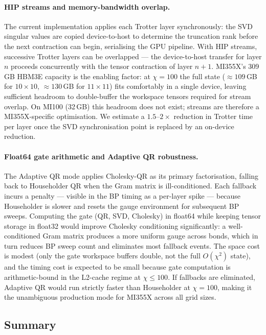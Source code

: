 \paragraph{HIP streams and memory-bandwidth overlap.}
The current implementation applies each Trotter layer synchronously:
the SVD singular values are copied device-to-host to determine the
truncation rank before the next contraction can begin, serialising the
GPU pipeline.
With HIP streams, successive Trotter layers can be overlapped ---
the device-to-host transfer for layer $n$ proceeds concurrently with
the tensor contraction of layer $n+1$.
MI355X's 309\,GB HBM3E capacity is the enabling factor: at $\chi=100$
the full state (${\approx}109$\,GB for $10\times10$, ${\approx}130$\,GB
for $11\times11$) fits comfortably in a single device, leaving sufficient
headroom to double-buffer the workspace tensors required for stream overlap.
On MI100 (32\,GB) this headroom does not exist; streams are therefore
a MI355X-specific optimisation.
We estimate a $1.5$--$2\times$ reduction in Trotter time per layer once
the SVD synchronisation point is replaced by an on-device reduction.

\paragraph{Float64 gate arithmetic and Adaptive QR robustness.}
The Adaptive QR mode applies Cholesky-QR as its primary factorisation,
falling back to Householder QR when the Gram matrix is ill-conditioned.
Each fallback incurs a penalty --- visible in the BP timing as a
per-layer spike --- because Householder is slower and resets the gauge
environment for subsequent BP sweeps.
Computing the gate (QR, SVD, Cholesky) in float64 while keeping tensor
storage in float32 would improve Cholesky conditioning significantly:
a well-conditioned Gram matrix produces a more uniform gauge across bonds,
which in turn reduces BP sweep count and eliminates most fallback events.
The space cost is modest (only the gate workspace buffers double, not the
full $O(\chi^2)$ state), and the timing cost is expected to be small
because gate computation is arithmetic-bound in the L2-cache regime
at $\chi \leq 100$.
If fallbacks are eliminated, Adaptive QR would run strictly faster than
Householder at $\chi=100$, making it the unambiguous production mode for
MI355X across all grid sizes.

\subsection{Summary}

